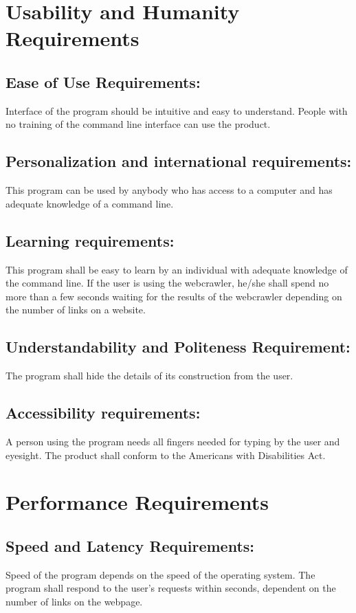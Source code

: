 \documentclass[titlepage]{article}
\begin{document}
\section{Usability and Humanity Requirements }

\subsection*{Ease of Use Requirements:} Interface of the program should be intuitive and easy to understand. People with no training of the command line interface can use the product.

\subsection*{Personalization and international requirements: }This program can be used by anybody who has access to a computer and has adequate knowledge of a command line.

\subsection*{Learning requirements:}  This program shall be easy to learn by an individual with adequate knowledge of the command line. If the user is using the webcrawler, he/she shall spend no more than a few seconds waiting for the results of the webcrawler depending on the number of links on a website.

\subsection*{Understandability and Politeness Requirement: }The program shall hide the details of its construction from the user.

\subsection*{Accessibility requirements:} A person using the program needs all fingers needed for typing by the user and eyesight. The product shall conform to the Americans with Disabilities Act.

\section{Performance Requirements }

\subsection*{Speed and Latency Requirements:}
Speed of the program depends on the speed of the operating system. The program shall respond to the user's requests within seconds, dependent on the number of links on the webpage. 
\end{document}
